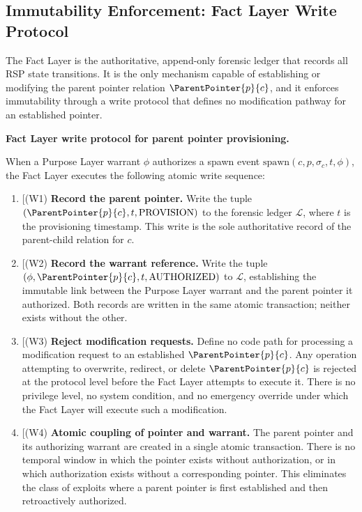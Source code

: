 \subsection{Immutability Enforcement: Fact Layer Write Protocol}
\label{sec:fact-layer-write-protocol}

The Fact Layer is the authoritative, append-only forensic ledger that records all RSP state transitions. It is the only mechanism capable of establishing or modifying the parent pointer relation $\ParentPointer{p}{c}$, and it enforces immutability through a write protocol that defines no modification pathway for an established pointer.

\medskip
\noindent\textbf{Fact Layer write protocol for parent pointer provisioning.}

When a Purpose Layer warrant $\phi$ authorizes a spawn event $\mathrm{spawn}(c, p, \sigma_c, t, \phi)$, the Fact Layer executes the following atomic write sequence:

\begin{enumerate}
    \item[(W1) \textbf{Record the parent pointer.} Write the tuple $(\ParentPointer{p}{c}, t, \mathrm{PROVISION})$ to the forensic ledger $\mathcal{L}$, where $t$ is the provisioning timestamp. This write is the sole authoritative record of the parent-child relation for $c$.

    \item[(W2) \textbf{Record the warrant reference.} Write the tuple $(\phi, \ParentPointer{p}{c}, t, \mathrm{AUTHORIZED})$ to $\mathcal{L}$, establishing the immutable link between the Purpose Layer warrant and the parent pointer it authorized. Both records are written in the same atomic transaction; neither exists without the other.

    \item[(W3) \textbf{Reject modification requests.} Define no code path for processing a modification request to an established $\ParentPointer{p}{c}$. Any operation attempting to overwrite, redirect, or delete $\ParentPointer{p}{c}$ is rejected at the protocol level before the Fact Layer attempts to execute it. There is no privilege level, no system condition, and no emergency override under which the Fact Layer will execute such a modification.

    \item[(W4) \textbf{Atomic coupling of pointer and warrant.} The parent pointer and its authorizing warrant are created in a single atomic transaction. There is no temporal window in which the pointer exists without authorization, or in which authorization exists without a corresponding pointer. This eliminates the class of exploits where a parent pointer is first established and then retroactively authorized.
\end{enumerate}

